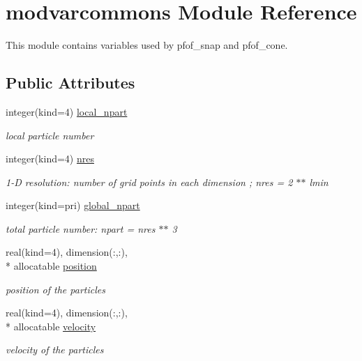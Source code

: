 \hypertarget{classmodvarcommons}{\section{modvarcommons Module Reference}
\label{classmodvarcommons}
}


This module contains variables used by pfof\-\_\-snap and pfof\-\_\-cone.  


\subsection*{Public Attributes}
\begin{DoxyCompactItemize}
\item 
integer(kind=4) \hyperlink{classmodvarcommons_ac6a221a790865b56b21df2f1cb544e4c}{local\-\_\-npart}
\begin{DoxyCompactList}\small\item\em local particle number \end{DoxyCompactList}\item 
integer(kind=4) \hyperlink{classmodvarcommons_ad7c50fb83d1dfe26ec032d10928a5f77}{nres}
\begin{DoxyCompactList}\small\item\em 1-\/\-D resolution\-: number of grid points in each dimension ; nres = 2 $\ast$$\ast$ lmin \end{DoxyCompactList}\item 
integer(kind=pri) \hyperlink{classmodvarcommons_a76303173f75dcfe82023dfe19fc22fbb}{global\-\_\-npart}
\begin{DoxyCompactList}\small\item\em total particle number\-: npart = nres $\ast$$\ast$ 3 \end{DoxyCompactList}\item 
real(kind=4), dimension(\-:,\-:), \\*
allocatable \hyperlink{classmodvarcommons_a1b79bd5412057e847c022c233c3919cf}{position}
\begin{DoxyCompactList}\small\item\em position of the particles \end{DoxyCompactList}\item 
real(kind=4), dimension(\-:,\-:), \\*
allocatable \hyperlink{classmodvarcommons_a7671f66edc6e99da11ea2ee4c246e033}{velocity}
\begin{DoxyCompactList}\small\item\em velocity of the particles \end{DoxyCompactList}\item 

\end{DoxyCompactItemize}
